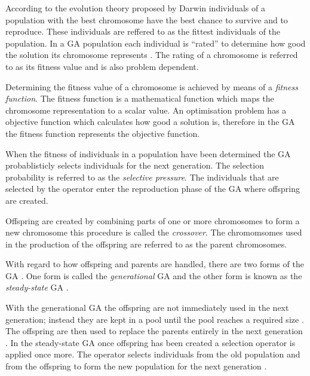 According to the evolution theory proposed by Darwin individuals of a population with the best chromosome have the best chance to survive and to reproduce\cite{CompuIntelligenceIntro}. These individuals are reffered to as the fittest individuals of the population. In a \gls{GA} population each individual is ``rated'' to determine how good the solution its chromosome represents \cite{CompuIntelligenceIntro}. The rating of a chromosome is referred to as its fitness value and is also problem dependent\cite{CompuIntelligenceIntro}.

Determining the fitness value of a chromosome is achieved by means of a \emph{fitness function}. The fitness function is a mathematical function which maps the chromosome representation to a scalar value\cite{CompuIntelligenceIntro}. An optimisation problem has a objective function which calculates how good a solution is, therefore in the \gls{GA} the fitness function represents the objective function\cite{CompuIntelligenceIntro}.

When the fitness of individuals in a population have been determined the \gls{GA} probablisticly selects individuals for the next generation\cite{CompuIntelligenceIntro}. The selection probability is referred to as the \emph{selective pressure}\cite{CompuIntelligenceIntro}. The individuals that are selected by the operator enter the reproduction phase of the \gls{GA} where offspring are created\cite{CompuIntelligenceIntro}.

Offspring are created by combining parts of one or more chromosomes to form a new chromosome this procedure is called the \emph{crossover}\cite{CompuIntelligenceIntro}. The chromomsomes used in the production of the offspring are referred to as the parent chromosomes\cite{CompuIntelligenceIntro}.

With regard to how offspring and parents are handled, there are two forms of the \gls{GA} \cite{FamilyGA}. One form is called the \emph{generational} \gls{GA}  and the other form is known as the \emph{steady-state} \gls{GA} \cite{GeostatisticalGA,FamilyGA}.

With the generational \gls{GA} the offspring are not immediately used in the next generation; instead they are kept in a pool until the pool reaches a required size \cite{FamilyGA}. The offspring are then used to replace the parents entirely in the next generation \cite{FamilyGA}. In the steady-state \gls{GA} once offspring has been created a selection operator is applied once more. The operator selects individuals from the old population and from the offspring to form the new population for the next generation \cite{GeostatisticalGA,FamilyGA}.


